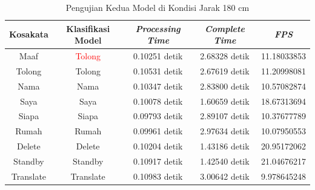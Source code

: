 \begin{longtable}{|c|c|c|c|c|}
  \caption{Pengujian Kedua Model di Kondisi Jarak 180 cm}
  \label{tb:prediksipendek2}                                   \\
  \hline
  \rowcolor[HTML]{C0C0C0}
  \textbf{Kosakata} & \textbf{Klasifikasi Model} & \textbf{\emph{Processing Time}} & \textbf{\emph{Complete Time}} & \textbf{\emph{FPS}}\\
  \hline
  Maaf              & \textcolor{red}{Tolong}       & 0.10251 detik                           & 2.68328 detik                                 & 11.18033853\\
  Tolong            & Tolong                        & 0.10531 detik                           & 2.67619 detik                                 & 11.20998081\\
  Nama              & Nama                          & 0.10347 detik                           & 2.83800 detik                                 & 10.57082874\\
  Saya              & Saya                          & 0.10078 detik                           & 1.60659 detik                                 & 18.67313694\\
  Siapa             & Siapa                         & 0.09793 detik                           & 2.89107 detik                                 & 10.37677789\\
  Rumah             & Rumah                         & 0.09961 detik                           & 2.97634 detik                                 & 10.07950553\\
  Delete            & Delete                        & 0.10204 detik                           & 1.43186 detik                                 & 20.95172062\\
  Standby           & Standby                       & 0.10917 detik                           & 1.42540 detik                                 & 21.04676217\\
  Translate         & Translate                     & 0.10983 detik                           & 3.00642 detik                                 & 9.978645248\\
  \hline
\end{longtable}


